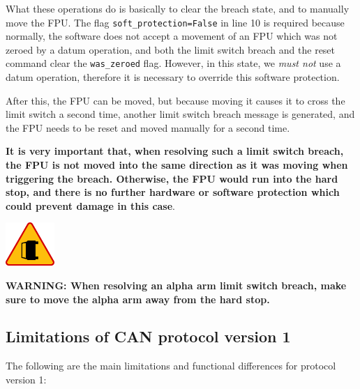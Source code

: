 \documentclass[11pt,a4paper]{scrartcl}
\newenvironment{warning}{\begin{framed}\includegraphics[width=5em]{accident-area-ahead.png}
}{\end{framed}}
\begin{document}
What these operations do is basically to clear the breach state, and
to manually move the FPU.  The flag \texttt{soft\_protection=False}
in line 10 is required because normally, the software does not accept
a movement of an FPU which was not zeroed by a datum operation, and
both the limit switch breach and the reset command clear the
\texttt{was\_zeroed} flag. However, in this state, we \emph{must not}
use a datum operation, therefore it is necessary to override this
software protection.

After this, the FPU can be moved, but because moving it causes it to
cross the limit switch a second time, another limit switch breach
message is generated, and the FPU needs to be reset and moved manually
for a second time.

\textbf{It is very important that, when resolving such a limit switch
  breach, the FPU is not moved into the same direction as it was
  moving when triggering the breach.  Otherwise, the FPU would run
  into the hard stop, and there is no further hardware or software
  protection which could prevent damage in this case}.

\begin{warning}
  \textbf{WARNING: When resolving an alpha arm limit switch
    breach, make sure to move the alpha arm away from the hard stop.}
\end{warning}

\subsection{Limitations of CAN protocol version 1}
The following are the main limitations and functional
differences for protocol version 1:
\end{document}
